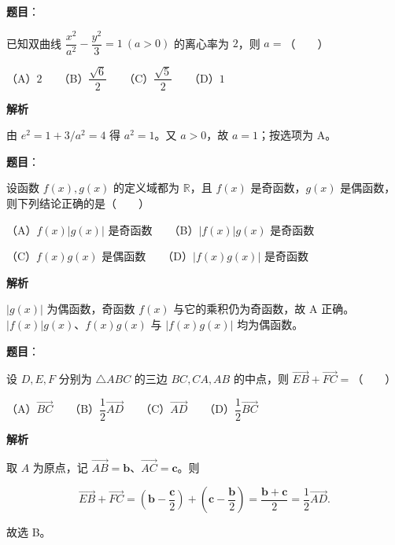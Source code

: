 \begin{answer}

\textbf{题目}：

已知双曲线 $\dfrac{x^2}{a^2}-\dfrac{y^2}{3}=1\ (a>0)$ 的离心率为 $2$，则 $a=$\mbox{（　　）}

（A）$2$　　（B）$\dfrac{\sqrt6}{2}$　　（C）$\dfrac{\sqrt5}{2}$　　（D）$1$

\textbf{解析}

由 $e^2=1+3/a^2=4$ 得 $a^2=1$。又 $a>0$，故 $a=1$；按选项为 A。


\end{answer}
\begin{answer}

\textbf{题目}：

设函数 $f(x),g(x)$ 的定义域都为 $\mathbb R$，且 $f(x)$ 是奇函数，$g(x)$ 是偶函数，则下列结论正确的是\mbox{（　　）}

（A）$f(x)|g(x)|$ 是奇函数　　（B）$|f(x)|g(x)$ 是奇函数

（C）$f(x)g(x)$ 是偶函数　　（D）$|f(x)g(x)|$ 是奇函数

\textbf{解析}

$|g(x)|$ 为偶函数，奇函数 $f(x)$ 与它的乘积仍为奇函数，故 A 正确。$|f(x)|g(x)$、$f(x)g(x)$ 与 $|f(x)g(x)|$ 均为偶函数。


\end{answer}
\begin{answer}

\textbf{题目}：

设 $D,E,F$ 分别为 $\triangle ABC$ 的三边 $BC,CA,AB$ 的中点，则 $\overrightarrow{EB}+\overrightarrow{FC}=$\mbox{（　　）}

（A）$\overrightarrow{BC}$　　（B）$\dfrac12\overrightarrow{AD}$　　（C）$\overrightarrow{AD}$　　（D）$\dfrac12\overrightarrow{BC}$

\textbf{解析}

取 $A$ 为原点，记 $\overrightarrow{AB}=\boldsymbol b$、$\overrightarrow{AC}=\boldsymbol c$。则

\nopagebreak[4]
\[
\overrightarrow{EB}+\overrightarrow{FC}
=\left(\boldsymbol b-\frac{\boldsymbol c}{2}\right)+\left(\boldsymbol c-\frac{\boldsymbol b}{2}\right)
=\frac{\boldsymbol b+\boldsymbol c}{2}=\frac12\overrightarrow{AD}.
\]

故选 B。


\end{answer}
